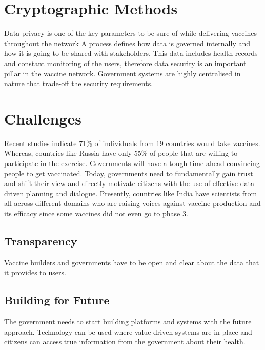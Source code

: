 \documentclass{article}
\begin{document}
\section{Cryptographic Methods}

Data privacy is one of the key parameters to be sure of while delivering vaccines throughout the network A process defines how data is governed internally and how it is going to be shared with stakeholders. This data includes health records and constant monitoring of the users, therefore data security is an important pillar in the vaccine network. Government systems are highly centralised in nature that trade-off the security requirements. 
	
\section{Challenges}

Recent studies indicate 71\% of individuals from 19 countries would take vaccines. Whereas, countries like Russia have only 55\% of people that are willing to participate in the exercise. Governments will have a tough time ahead convincing people to get vaccinated. Today, governments need to fundamentally gain trust and shift their view and directly motivate citizens with the use of effective data-driven planning and dialogue. Presently, countries like India have scientists from all across different domains who are raising voices against vaccine production and its efficacy since some vaccines did not even go to phase 3. 

\subsection{Transparency}

Vaccine builders and governments have to be open and clear about the data that it provides to users.

\subsection{Building for Future}

The government needs to start building platforms and systems with the future approach. Technology can be used where value driven systems are in place and citizens can access true information from the government about their health.	
  




\end{document}
